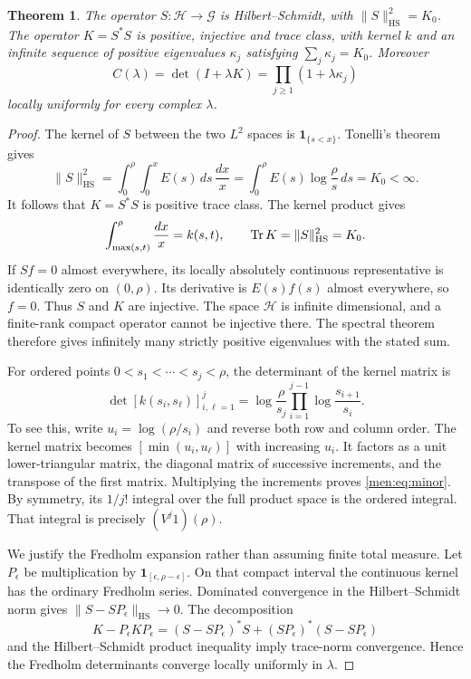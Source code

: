 \documentclass[11pt,letterpaper]{article}
\newtheorem{theorem}{Theorem}[section]
\theoremstyle{remark}\newtheorem{remark}[theorem]{Remark}
\newcommand{\one}{\mathbf 1}\newcommand{\fall}[2]{#1^{\underline{#2}}}
\newcommand{\HH}{\mathcal H}\newcommand{\GG}{\mathcal G}
\begin{document}
\begin{theorem}\label{men:thm:fredholm}
The operator $S:\HH\to\GG$ is Hilbert--Schmidt, with $\|S\|_{\mathrm{HS}}^2=K_0$. The operator $K=S^*S$ is positive, injective and trace class, with kernel $k$ and an infinite sequence of positive eigenvalues $\kappa_j$ satisfying $\sum_j\kappa_j=K_0$. Moreover
\begin{equation}\label{men:eq:determinant}
 C(\lambda)=\det(I+\lambda K)=\prod_{j\ge1}(1+\lambda\kappa_j)
\end{equation}
locally uniformly for every complex $\lambda$.
\end{theorem}
\begin{proof}
The kernel of $S$ between the two $L^2$ spaces is $\one_{\{s<x\}}$. Tonelli's theorem gives
\[
 \|S\|_{\mathrm{HS}}^2
 =\int_0^\rho\int_0^x E(s)\,ds\,\frac{dx}x
 =\int_0^\rho E(s)\log\frac\rho s\,ds=K_0<\infty.
\]
It follows that $K=S^*S$ is positive trace class. The kernel product gives
\[
 \int_{\max(s,t)}^\rho\frac{dx}x=k(s,t),\qquad
 \operatorname{Tr} K=\|S\|_{\mathrm{HS}}^2=K_0.
\]
If $Sf=0$ almost everywhere, its locally absolutely continuous representative is identically zero on $(0,\rho)$. Its derivative is $E(s)f(s)$ almost everywhere, so $f=0$. Thus $S$ and $K$ are injective. The space $\HH$ is infinite dimensional, and a finite-rank compact operator cannot be injective there. The spectral theorem therefore gives infinitely many strictly positive eigenvalues with the stated sum.

For ordered points $0<s_1<\cdots<s_j<\rho$, the determinant of the kernel matrix is
\begin{equation}\label{men:eq:minor}
 \det[k(s_i,s_\ell)]_{i,\ell=1}^j
 =\log\frac\rho{s_j}\prod_{i=1}^{j-1}\log\frac{s_{i+1}}{s_i}.
\end{equation}
To see this, write $u_i=\log(\rho/s_i)$ and reverse both row and column order. The kernel matrix becomes $[\min(u_i,u_\ell)]$ with increasing $u_i$. It factors as a unit lower-triangular matrix, the diagonal matrix of successive increments, and the transpose of the first matrix. Multiplying the increments proves \eqref{men:eq:minor}. By symmetry, its $1/j!$ integral over the full product space is the ordered integral. That integral is precisely $(V^j1)(\rho)$.

We justify the Fredholm expansion rather than assuming finite total measure. Let $P_\epsilon$ be multiplication by $\one_{[\epsilon,\rho-\epsilon]}$. On that compact interval the continuous kernel has the ordinary Fredholm series. Dominated convergence in the Hilbert--Schmidt norm gives $\|S-SP_\epsilon\|_{\mathrm{HS}}\to0$. The decomposition
\[
 K-P_\epsilon KP_\epsilon
   =(S-SP_\epsilon)^*S+(SP_\epsilon)^*(S-SP_\epsilon)
\]
and the Hilbert--Schmidt product inequality imply trace-norm convergence. Hence the Fredholm determinants converge locally uniformly in $\lambda$.


\end{proof}
\end{document}

